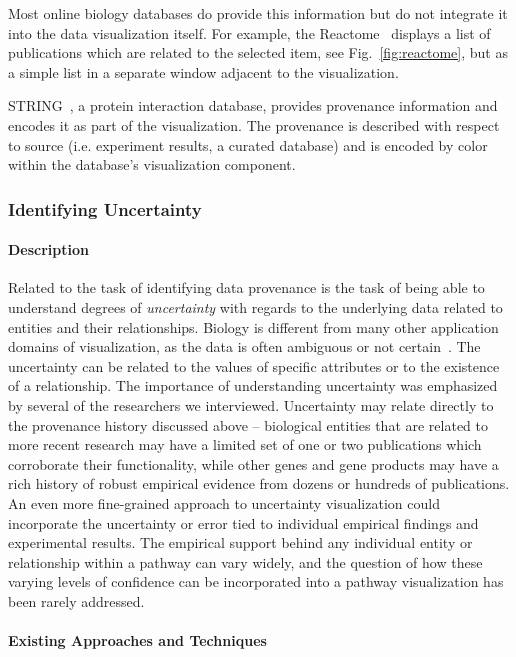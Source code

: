 \documentclass[twocolumn]{bmcart}%
\begin{document}
Most online biology databases do provide this information but do not integrate it into the data visualization itself.
For example, the Reactome~\cite{croft2014reactome} displays a list of publications which are related to the selected item, see Fig.~\ref{fig:reactome}, but as a simple list in a separate window adjacent to the visualization.

STRING~\cite{STRING2005}, a protein interaction database, provides provenance information and encodes it as part of the visualization.
The provenance is described with respect to source (i.e. experiment results, a curated database) and is encoded by color within the database's visualization component.

\subsubsection*{Identifying Uncertainty}

\paragraph*{Description}

Related to the task of identifying data provenance is the task of being able to understand degrees of \textit{uncertainty} with regards to the underlying data related to entities and their relationships.
Biology is different from many other application domains of visualization, as the data is often ambiguous or not certain~\cite{kohlbacher2014multivariate}.
The uncertainty can be related to the values of specific attributes or to the existence of a relationship.
The importance of understanding uncertainty was emphasized by several of the researchers we interviewed.
Uncertainty may relate directly to the provenance history discussed above -- biological entities that are related to more recent research may have a limited set of one or two publications which corroborate their functionality, while other genes and gene products may have a rich history of robust empirical evidence from dozens or hundreds of publications.
An even more fine-grained approach to uncertainty visualization could incorporate the uncertainty or error tied to individual empirical findings and experimental results.
The empirical support behind any individual entity or relationship within a pathway can vary widely, and the question of how these varying levels of confidence can be incorporated into a pathway visualization has been rarely addressed.

\paragraph*{Existing Approaches and Techniques}
\end{document}
